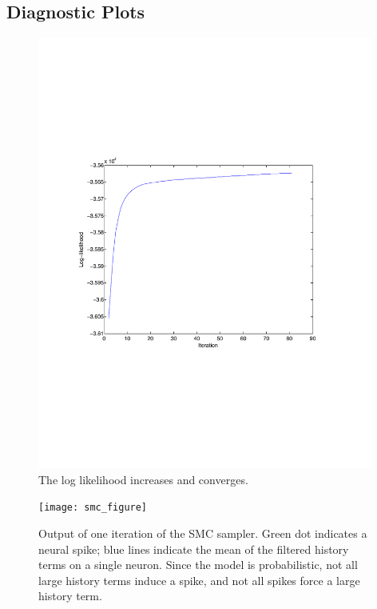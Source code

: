 \documentclass{article}
\begin{document}
\subsection{Diagnostic Plots}
\begin{figure}
\label{loglikelihood}
\centering
\includegraphics[width=0.98\textwidth, trim = 15mm 15mm 15mm 15mm, clip]{25n_noise_ll}
\caption{The log likelihood increases and converges.}
\end{figure}

\begin{figure}
\label{loglikelihood}
\centering
\texttt{[image: smc\_figure]}
\caption{Output of one iteration of the SMC sampler. Green dot indicates a neural spike; blue lines indicate the mean of the filtered history terms on a single neuron. Since the model is probabilistic, not all large history terms induce a spike, and not all spikes force a large history term.}
\end{figure}
\end{document}
